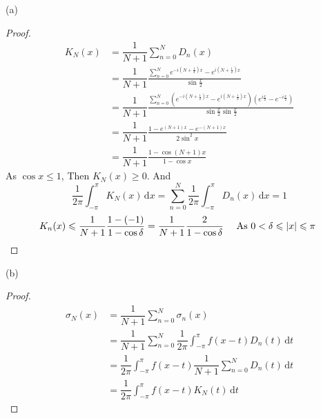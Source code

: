 \documentclass{article}
\begin{document}
(a)\begin{proof}
    \begin{align*}
        K_N(x)&=\dfrac{1}{N+1}\sum\limits_{n=0}^{N } D_n(x)\\
        &=\dfrac{1}{N+1}\frac{\sum\limits_{n=0}^{N }e^{-i(N+\frac{1}{2})x}-e^{i(N+\frac{1 }{2})x}}{\sin{\frac{x }{2 }}}\\
        &=\dfrac{1}{N+1}\frac{\sum\limits_{n=0 }^{N } (e^{-i(N+\frac{1}{2})x}-e^{i(N+\frac{1 }{2})x})(e^{i\frac{x }{2}}-e^{-i\frac{x }{2}})}{\sin{\frac{x}{2 } }\sin{\frac{x }{2 }}}\\
        &=\dfrac{1}{N+1}\frac{1-e^{(N+1)x}-e^{-(N+1)x}}{2\sin^2{x}}\\
        &=\dfrac{1 }{N+1}\frac{1-\cos{(N+1)x}}{1-\cos{x}}
    \end{align*}
    As  $ \cos {x}  \leqslant 1 $, Then  $ K_N (x)\geqslant 0 $. And
    \[\dfrac{1 }{2\pi }\int_{-\pi }^{\pi}K_N(x) \, \mathrm{d}x  =\sum\limits_{n=0 }^{N } \dfrac{1 }{2\pi}\int_{-\pi }^{\pi} D_n(x)\, \mathrm{d}x=1  \]  
    \[
        K_n(x) \leqslant \dfrac{1}{N+1}\dfrac{1-(-1)}{1-\cos{\delta}}=\dfrac{1}{N+1}\dfrac{2}{1-\cos{\delta}}\quad\text{ As  $ 0<\delta \leqslant |x| \leqslant \pi $ }
    \]
    
\end{proof}
(b)\begin{proof}
    \begin{align*}
        \sigma_N(x)&=\dfrac{1 }{N+1}\sum\limits_{n=0}^{N } \sigma_n(x)\\
        &=\dfrac{1 }{N+1}\sum\limits_{n=0}^{N }\dfrac{1 }{2\pi }\int_{-\pi }^{\pi} f(x-t)D_n(t)\, \mathrm{d}t\\
        &=\dfrac{1 }{2\pi}\int_{-\pi }^{\pi } f(x-t)\dfrac{1 }{N+1}\sum\limits_{n=0}^{N }D_n(t)\, \mathrm{d}t\\
        &=\dfrac{1 }{2\pi }\int_{-\pi }^{\pi } f(x-t)K_N(t)\, \mathrm{d}t      
    \end{align*}
\end{proof}
\end{document}

